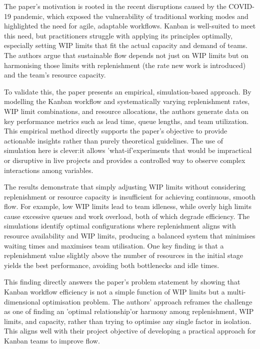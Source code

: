 \documentclass{report}
\begin{document}
The paper's motivation is rooted in the recent disruptions caused by the COVID-19 pandemic, which exposed the vulnerability of traditional working modes and highlighted the need for agile, adaptable workflows. Kanban is well-suited to meet this need, but practitioners struggle with applying its principles optimally, especially setting WIP limits that fit the actual capacity and demand of teams. The authors argue that sustainable flow depends not just on WIP limits but on harmonising those limits with replenishment (the rate new work is introduced) and the team's resource capacity.

To validate this, the paper presents an empirical, simulation-based approach. By modelling the Kanban workflow and systematically varying replenishment rates, WIP limit combinations, and resource allocations, the authors generate data on key performance metrics such as lead time, queue lengths, and team utilization. This empirical method directly supports the paper's objective to provide actionable insights rather than purely theoretical guidelines. The use of simulation here is clever:it allows 'what-if'experiments that would be impractical or disruptive in live projects and provides a controlled way to observe complex interactions among variables.

The results demonstrate that simply adjusting WIP limits without considering replenishment or resource capacity is insufficient for achieving continuous, smooth flow. For example, low WIP limits lead to team idleness, while overly high limits cause excessive queues and work overload, both of which degrade efficiency. The simulations identify optimal configurations where replenishment aligns with resource availability and WIP limits, producing a balanced system that minimises waiting times and maximises team utilisation. One key finding is that a replenishment value slightly above the number of resources in the initial stage yields the best performance, avoiding both bottlenecks and idle times.

This finding directly answers the paper's problem statement by showing that Kanban workflow efficiency is not a simple function of WIP limits but a multi-dimensional optimisation problem. The authors' approach reframes the challenge as one of finding an 'optimal relationship'or harmony among replenishment, WIP limits, and capacity, rather than trying to optimise any single factor in isolation. This aligns well with their project objective of developing a practical approach for Kanban teams to improve flow.
\end{document}
